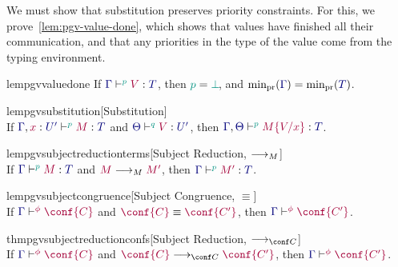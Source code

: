 \documentclass[main.tex]{subfiles}
\begin{document}
We must show that substitution preserves priority constraints. For this, we prove~\cref{lem:pgv-value-done}, which shows that values have finished all their communication, and that any priorities in the type of the value come from the typing environment.
\begin{compacttheorems}
  \begin{restatablelemma}{lempgvvaluedone}%
    \label{lem:pgv-value-done}
    If $\tseq[\cs{p}]{\ty{\Gamma}}{V}{T}$, then $\cs{p}=\cs{\pbot}$, and $\minpr(\ty{\Gamma})=\minpr(\ty{T})$.
  \end{restatablelemma}
  \begin{restatablelemma}{lempgvsubstitution}[Substitution]%
    \label{lem:pgv-substitution}
    \hfill\\%
    If $\tseq[\cs{p}]{\ty{\Gamma},\tmty{x}{U'}}{M}{T}$ and $\tseq[\cs{q}]{\ty{\Theta}}{V}{U'}$, then $\tseq[\cs{p}]{\ty{\Gamma},\ty{\Theta}}{\subst{M}{V}{x}}{T}$.
  \end{restatablelemma}
  \begin{restatablelemma}{lempgvsubjectreductionterms}[Subject Reduction, $\longrightarrow_{M}$]%
    \label{lem:pgv-subject-reduction-terms}
    \hfill\\%
    If $\tseq[\cs{p}]{\ty{\Gamma}}{M}{T}$ and $\tm{M}\tred\tm{M'}$,
    then $\tseq[\cs{p}]{\ty{\Gamma}}{M'}{T}$.
  \end{restatablelemma}
  \begin{restatablelemma}{lempgvsubjectcongruence}[Subject Congruence, $\equiv$]%
    \label{lem:pgv-subject-congruence}
    \hfill\\%
    If $\cseq[\phi]{\ty{\Gamma}}{\conf{C}}$ and $\tm{\conf{C}}\equiv\tm{\conf{C'}}$,
    then $\cseq[\phi]{\ty{\Gamma}}{\conf{C'}}$.
  \end{restatablelemma}
  \begin{restatabletheorem}{thmpgvsubjectreductionconfs}[Subject Reduction, $\cred$]%
    \label{thm:pgv-subject-reduction-confs}
    \hfill\\%
    If $\cseq[\phi]{\ty{\Gamma}}{\conf{C}}$ and $\tm{\conf{C}}\cred\tm{\conf{C'}}$,
    then $\cseq[\phi]{\ty{\Gamma}}{\conf{C'}}$.
  \end{restatabletheorem}
\end{compacttheorems}
\end{document}
